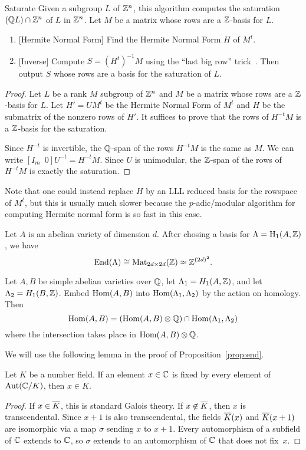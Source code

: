 \documentclass{article}
\begin{document}
\begin{algorithm}{Saturate}
    \label{alg:saturate}
    Given a subgroup $L$ of $\mathbb{Z}^n$, this algorithm computes
    the saturation $(\mathbb{Q} L) \cap \mathbb{Z}^n$ of $L$ in $\mathbb{Z}^n$.
    Let $M$ be a matrix whose rows are a $\mathbb{Z}$-basis for $L$.
    \begin{enumerate}
        \item{} [Hermite Normal Form] Find the Hermite Normal Form $H$ of $M^t$.
        \item{} [Inverse] Compute $S = (H^t)^{-1} M$ using the ``last big row''
            trick~\cite{pernet-stein:hnf}.
            Then output $S$ whose rows are a basis for the saturation of $L$.
    \end{enumerate}
\end{algorithm}
\begin{proof}
    Let $L$ be a rank $M$ subgroup of $\mathbb{Z}^n$ and $M$ be a matrix whose rows are
    a $\mathbb{Z}$-basis for $L$. Let $H'=UM^t$ be the Hermite Normal Form of $M^t$ and
    $H$ be the submatrix of the nonzero rows of $H'$. It suffices to prove that
    the rows of $H^{-t} M$ is a $\mathbb{Z}$-basis for the saturation.

    Since $H^{-t}$ is invertible, the $\mathbb{Q}$-span of the rows $H^{-t}M$ is the
    same as $M$. We can write $[I_m \enspace  0] U^{-t}=H^{-t}M$. Since $U$ is
    unimodular, the $\mathbb{Z}$-span of the rows of $H^{-t}M$ is exactly the
    saturation.
\end{proof}

Note that one could instead replace $H$ by an LLL reduced basis for
the rowspace of $M^t$, but this is usually much slower because the
$p$-adic/modular algorithm \cite{TODO} for computing Hermite normal
form is so fast in this case.


Let $A$ is an abelian variety of dimension $d$. After chosing a basis for
$\Lambda = \operatorname{H}_1(A,\mathbb{Z})$, we have
\[
\operatorname{End}(\Lambda)\cong \operatorname{Mat}_{2d\times 2d}(\mathbb{Z}) \approx \mathbb{Z}^{(2d)^2}.
\]

\begin{proposition}\label{prop:end}
    Let $A, B$ be simple abelian varieties over $\mathbb{Q}$, let $\Lambda_1=H_1(A,
    \mathbb{Z})$, and let $\Lambda_2=H_1(B, \mathbb{Z})$. Embed $\operatorname{Hom}(A, B)$ into
    $\operatorname{Hom}(\Lambda_1, \Lambda_2)$ by the action on homology. Then
    \[
        \operatorname{Hom}(A, B) = 
        (\operatorname{Hom}(A, B) \otimes \mathbb{Q})\cap \operatorname{Hom}(\Lambda_1, \Lambda_2)
    \]
    where the intersection takes place in $\operatorname{Hom}(A,B)\otimes \mathbb{Q}$.
\end{proposition}
We will use the following lemma in the proof of Proposition~\ref{prop:end}.
\begin{lemma}\label{lem:gal}
    Let $K$ be a number field.  If an element $x\in \mathbb{C}$ is fixed by
    every element of $\operatorname{Aut}(\mathbb{C}/K)$, then $x\in K$.
\end{lemma}
\begin{proof}
    If $x\in\overline{K}$, this is standard Galois theory.  If $x\not\in
    \overline{K}$, then $x$ is transcendental.  Since $x+1$ is also transcendental,
    the fields $\overline{K}(x)$ and $\overline{K}(x+1)$ are isomorphic via a map $\sigma$
    sending $x$ to $x+1$.  Every automorphism of a subfield of $\mathbb{C}$
    extends to $\mathbb{C}$, so $\sigma$ extends to an automorphism of $\mathbb{C}$
    that does not fix~$x$.
\end{proof}
\end{document}
